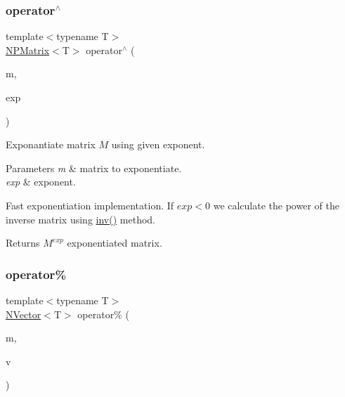 \subsubsection{\texorpdfstring{operator$^\wedge$}{operator^}}
{\footnotesize\ttfamily template$<$typename T$>$ \\
\mbox{\hyperlink{class_n_p_matrix}{N\+P\+Matrix}}$<$T$>$ operator$^\wedge$ (\begin{DoxyParamCaption}\item[{\mbox{\hyperlink{class_n_p_matrix}{N\+P\+Matrix}}$<$ T $>$}]{m,  }\item[{long}]{exp }\end{DoxyParamCaption})\hspace{0.3cm}{\ttfamily [friend]}}



Exponantiate matrix $ M $ using given exponent. 


\begin{DoxyParams}{Parameters}
{\em m} & matrix to exponentiate. \\
\hline
{\em exp} & exponent.\\
\hline
\end{DoxyParams}
Fast exponentiation implementation. If $ exp < 0 $ we calculate the power of the inverse matrix using {\ttfamily \mbox{\hyperlink{class_n_p_matrix_ac672c69c4b0ec298ac3e8326fcce48cb}{inv()}}} method. \begin{DoxyReturn}{Returns}
$ M^{exp} $ exponentiated matrix. 
\end{DoxyReturn}
\mbox{\label{class_n_p_matrix_a15e021ffe286b766ab68b83a6e70d891}} 
\subsubsection{\texorpdfstring{operator\%}{operator\%}}
{\footnotesize\ttfamily template$<$typename T$>$ \\
\mbox{\hyperlink{class_n_vector}{N\+Vector}}$<$T$>$ operator\% (\begin{DoxyParamCaption}\item[{const \mbox{\hyperlink{class_n_p_matrix}{N\+P\+Matrix}}$<$ T $>$ \&}]{m,  }\item[{\mbox{\hyperlink{class_n_vector}{N\+Vector}}$<$ T $>$}]{v }\end{DoxyParamCaption})\hspace{0.3cm}{\ttfamily [friend]}}




